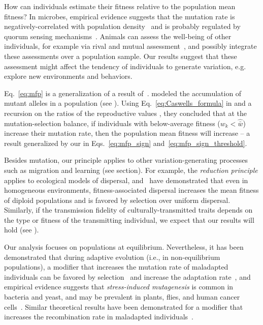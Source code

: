 \documentclass[12pt, twocolumn]{extarticle}
\begin{document}
How can individuals estimate their fitness relative to the population mean fitness? 
In microbes, empirical evidence suggests that the mutation rate is negatively-correlated with population density~\citep{Krasovec2017} and is probably regulated by quorum sensing mechanisms~\citep{Krasovec2014,Dellus-Gur2017}.
Animals can assess the well-being of other individuals, for example via rival and mutual assessment~\citep{Parker1974,Arnott2017,Reichert2017}, and possibly integrate these assessments over a population sample.
Our results suggest that these assessment might affect the tendency of individuals to generate variation, e.g. explore new environments and behaviors.

Eq.~\ref{eq:mfp} is a generalization of a result of~\citet[Eq.~4]{Ram2012}.
\citeauthor{Ram2012} modeled the accumulation of mutant alleles in a population (see ).
Using Eq.~\ref{eq:Caswells_formula} in  and a recursion on the ratios of the reproductive values \cite[see][eqs.~A5-6]{Ram2012}, they concluded that at the mutation-selection balance, if individuals with below-average fitness ($w_k < \hat{\bar w}$) increase their mutation rate, then the population mean fitness will increase -- a result generalized by our \emph{} in Eqs.~\ref{eq:mfp_sign} and~\ref{eq:mfp_sign_threshold}.

Besides mutation, our principle applies to other variation-generating processes such as migration and learning (see \emph{} section).
For example, the \emph{reduction principle} applies to ecological models of dispersal, and~\citet{Gueijman2013} have demonstrated that even in homogeneous environments, fitness-associated dispersal increases the mean fitness of diploid populations and is favored by selection over uniform dispersal.
Similarly, if the transmission fidelity of culturally-transmitted traits depends on the type or fitness of the transmitting individual, we expect that our results will hold (see ).

Our analysis focuses on populations at equilibrium.
Nevertheless, it has been demonstrated that during adaptive evolution (i.e., in non-equilibrium populations), a modifier that increases the mutation rate of maladapted individuals can be favored by selection~\citep{Ram2012,Lukacisinova2017} and increase the adaptation rate~\citep{Ram2014},
and empirical evidence suggests that \emph{stress-induced mutagenesis} is common in bacteria and yeast, and may be prevalent in plants, flies, and human cancer cells~\citep{Rosenberg2012,Fitzgerald2017b}.
Similar theoretical results have been demonstrated for a modifier that increases the recombination rate in maladapted individuals~\citep{Hadany2003b,Hadany2003a}.
\end{document}
